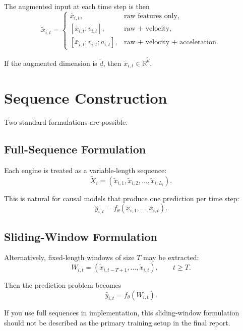 \documentclass[11pt,a4paper]{article}
\begin{document}
The augmented input at each time step is then
\begin{equation}
    \tilde{x}_{i,t} =
    \begin{cases}
        \bar{x}_{i,t}, & \text{raw features only},\\[4pt]
        [\bar{x}_{i,t}; v_{i,t}], & \text{raw + velocity},\\[4pt]
        [\bar{x}_{i,t}; v_{i,t}; a_{i,t}], & \text{raw + velocity + acceleration}.
    \end{cases}
\end{equation}

If the augmented dimension is $\tilde d$, then $\tilde{x}_{i,t} \in \mathbb{R}^{\tilde d}$.

\section{Sequence Construction}
Two standard formulations are possible.

\subsection{Full-Sequence Formulation}
Each engine is treated as a variable-length sequence:
\begin{equation}
    \tilde{X}_i = (\tilde{x}_{i,1}, \tilde{x}_{i,2}, \dots, \tilde{x}_{i,L_i}).
\end{equation}

This is natural for causal models that produce one prediction per time step:
\begin{equation}
    \hat{y}_{i,t} = f_\theta(\tilde{x}_{i,1},\dots,\tilde{x}_{i,t}).
\end{equation}

\subsection{Sliding-Window Formulation}
Alternatively, fixed-length windows of size $T$ may be extracted:
\begin{equation}
    W_{i,t} = (\tilde{x}_{i,t-T+1}, \dots, \tilde{x}_{i,t}),
    \qquad t \geq T.
\end{equation}

Then the prediction problem becomes
\begin{equation}
    \hat{y}_{i,t} = f_\theta(W_{i,t}).
\end{equation}

If you use full sequences in implementation, this sliding-window formulation should not be described as the primary training setup in the final report.
\end{document}
